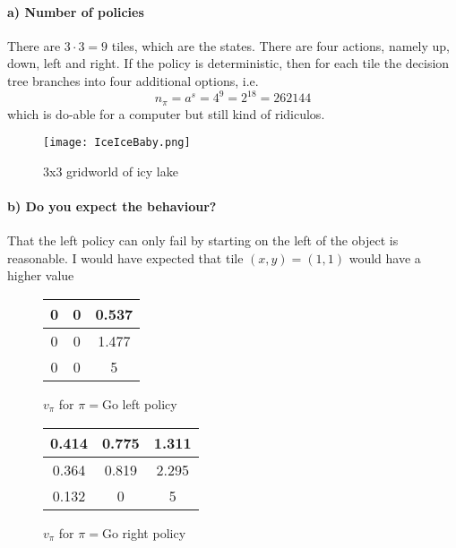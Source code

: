 \documentclass{article}
\begin{document}
\paragraph*{a) Number of policies}

There are $3\cdot 3 = 9$ tiles, which are the states. There are four actions, namely up, down, left and right. If the policy is deterministic, then for each tile the decision tree branches into four additional options, i.e.
\begin{equation}
    n_\pi = a^s = 4^{9} = 2^{18} = 262144
\end{equation}
which is do-able for a computer but still kind of ridiculos.

\begin{figure}[H]
    \centering
    \texttt{[image: IceIceBaby.png]}
    \caption{3x3 gridworld of icy lake}
    \label{fig:ice}
\end{figure}



\paragraph*{b) Do you expect the behaviour?}

That the left policy can only fail by starting on the left of the object is reasonable. I would have expected that tile $(x, y) = (1, 1)$ would have a higher value  
\begin{figure}[H]
    \begin{minipage}{0.45\textwidth}
    \centering
    \begin{tabular}{c|c|c}
    0 & 0 & 0.537 \\ \hline
    0 & 0 & 1.477 \\ \hline              
    0 & 0 & 5 \\
    \end{tabular}
    \caption{$v_\pi$ for $\pi =$Go left policy}
    \label{tab:table1}
    \end{minipage}
    \hfill
    \begin{minipage}{0.45\textwidth}
    \centering
    \begin{tabular}{c|c|c}
    0.414 & 0.775 & 1.311 \\ \hline
    0.364 & 0.819 & 2.295 \\ \hline                 
    0.132 & 0 & 5 \\
    \end{tabular}
    \caption{$v_\pi$ for $\pi =$Go right policy}
    \label{tab:table2}
    \end{minipage}
    \end{figure}
\end{document}

